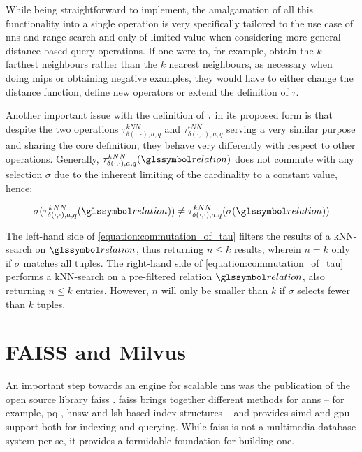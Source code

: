 While being straightforward to implement, the amalgamation of all this functionality into a single operation is very specifically tailored to the use case of \acrshort{nns} and range search and only of limited value when considering more general distance-based query operations. If one were to, for example, obtain the $k$ farthest neighbours rather than the $k$ nearest neighbours, as necessary when doing \acrshort{mips} or obtaining negative examples, they would have to either change the distance function, define new operators or extend the definition of $\tau$. 

Another important issue with the definition of $\tau$ in its proposed form is that despite the two operations $\tau^{kNN}_{\delta(\cdot,\cdot),a,q}$ and $\tau^{\epsilon NN}_{\delta(\cdot,\cdot),a,q}$ serving a very similar purpose and sharing the core definition, they behave very differently with respect to other operations. Generally, $\tau^{kNN}_{\delta(\cdot,\cdot),a,q}(\relation)$ does not commute with any selection $\sigma$ due to the inherent limiting of the cardinality to a constant value, hence:

\begin{equation}
    \label{equation:commutation_of_tau}
    \sigma(\tau^{kNN}_{\delta(\cdot,\cdot),a,q}(\relation)) \neq \tau^{kNN}_{\delta(\cdot,\cdot),a,q}(\sigma(\relation))
\end{equation}

The left-hand side of \cref{equation:commutation_of_tau} filters the results of a kNN-search on $\relation$, thus returning $n \leq k$ results, wherein $n = k$ only if $\sigma$ matches all tuples. The right-hand side of \cref{equation:commutation_of_tau} performs a kNN-search on a pre-filtered relation $\relation$, also returning $n \leq k$ entries. However, $n$ will only be smaller than $k$ if $\sigma$ selects fewer than $k$ tuples.

\section{FAISS and Milvus}

An important step towards an engine for scalable \acrshort{nns} was the publication of the open source library \acrfull{faiss} \cite{Johnson:2019Billion}. \acrshort{faiss} brings together different methods for \acrshort{anns} -- for example, \acrshort{pq} \cite{Jegou:2010Product}, \acrshort{hnsw} \cite{Malkov:2018Efficient} and \acrshort{lsh} \cite{Indyk1998:Approximate} based index structures -- and provides  \acrshort{simd} and \acrshort{gpu} support both for indexing and querying. While \acrshort{faiss} is not a multimedia database system per-se, it provides a formidable foundation for building one.

